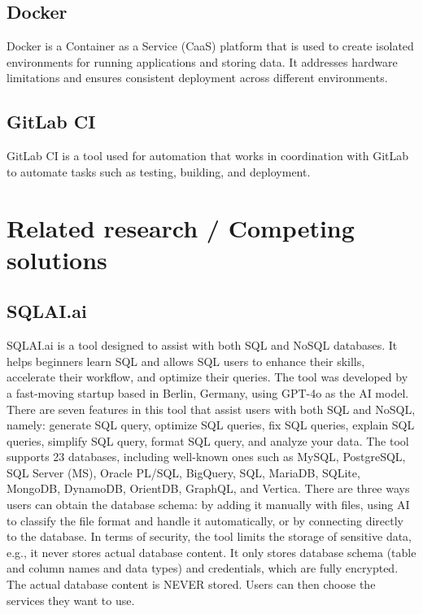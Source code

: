     \subsection{Docker}
    Docker is a Container as a Service (CaaS) platform that is used to create isolated environments for running applications and storing data. It addresses hardware limitations and ensures consistent deployment across different environments.
    \subsection{GitLab CI}
    GitLab CI is a tool used for automation that works in coordination with GitLab to automate tasks such as testing, building, and deployment.
\section{Related research / Competing solutions}
    \subsection{SQLAI.ai}
    SQLAI.ai is a tool designed to assist with both SQL and NoSQL databases. It helps beginners learn SQL and allows SQL users to enhance their skills, accelerate their workflow, and optimize their queries. The tool was developed by a fast-moving startup based in Berlin, Germany, using GPT-4o as the AI model. There are seven features in this tool that assist users with both SQL and NoSQL, namely: generate SQL query, optimize SQL queries, fix SQL queries, explain SQL queries, simplify SQL query, format SQL query, and analyze your data. The tool supports 23 databases, including well-known ones such as MySQL, PostgreSQL, SQL Server (MS), Oracle PL/SQL, BigQuery, SQL, MariaDB, SQLite, MongoDB, DynamoDB, OrientDB, GraphQL, and Vertica. There are three ways users can obtain the database schema: by adding it manually with files, using AI to classify the file format and handle it automatically, or by connecting directly to the database. In terms of security, the tool limits the storage of sensitive data, e.g., it never stores actual database content. It only stores database schema (table and column names and data types) and credentials, which are fully encrypted. The actual database content is NEVER stored. Users can then choose the services they want to use.
    
